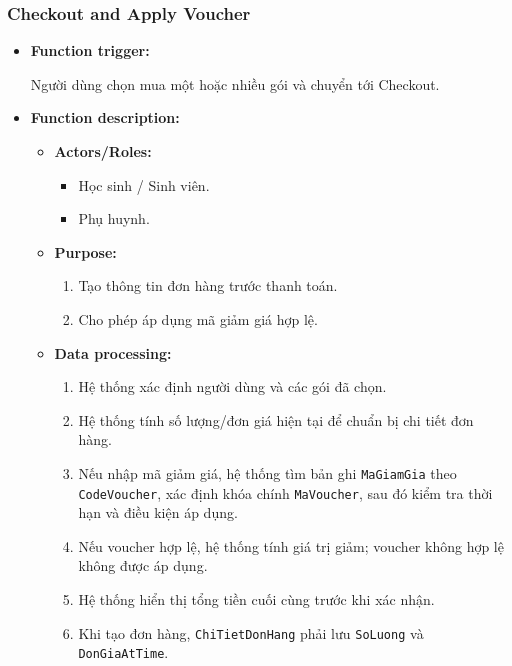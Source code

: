 \documentclass[12pt,a4paper,oneside]{report}
\begin{document}
\subsubsection{Checkout and Apply Voucher}
\label{subsubsec:checkout-apply-voucher}

\begin{itemize}

    \item \textbf{Function trigger:}

    Người dùng chọn mua một hoặc nhiều gói và chuyển tới Checkout.

    \item \textbf{Function description:}

    \begin{itemize}

        \item \textbf{Actors/Roles:}
        \begin{itemize}
            \item Học sinh / Sinh viên.
            \item Phụ huynh.
        \end{itemize}

        \item \textbf{Purpose:}
        \begin{enumerate}
            \item Tạo thông tin đơn hàng trước thanh toán.
            \item Cho phép áp dụng mã giảm giá hợp lệ.
        \end{enumerate}

        \item \textbf{Data processing:}
        \begin{enumerate}
            \item Hệ thống xác định người dùng và các gói đã chọn.
            \item Hệ thống tính số lượng/đơn giá hiện tại để chuẩn bị chi tiết đơn hàng.
            \item Nếu nhập mã giảm giá, hệ thống tìm bản ghi \texttt{MaGiamGia} theo \texttt{CodeVoucher}, xác định khóa chính \texttt{MaVoucher}, sau đó kiểm tra thời hạn và điều kiện áp dụng.
            \item Nếu voucher hợp lệ, hệ thống tính giá trị giảm; voucher không hợp lệ không được áp dụng.
            \item Hệ thống hiển thị tổng tiền cuối cùng trước khi xác nhận.
            \item Khi tạo đơn hàng, \texttt{ChiTietDonHang} phải lưu \texttt{SoLuong} và \texttt{DonGiaAtTime}.
        \end{enumerate}


\end{itemize}
\end{itemize}
\end{document}
